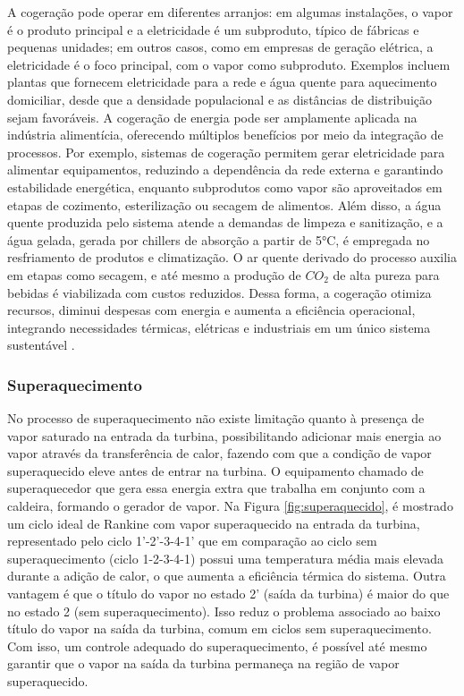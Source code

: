 \documentclass[
	article,			%
	11pt,				%
	oneside,			%
	a4paper,			%
	english,			%
	brazil,				%
	sumario=tradicional
	]{abntex2}
\begin{document}
A cogeração pode operar em diferentes arranjos: em algumas instalações, o vapor é o produto principal e a eletricidade é um subproduto, típico de fábricas e pequenas unidades; em outros casos, como em empresas de geração elétrica, a eletricidade é o foco principal, com o vapor como subproduto. Exemplos incluem plantas que fornecem eletricidade para a rede e água quente para aquecimento domiciliar, desde que a densidade populacional e as distâncias de distribuição sejam favoráveis.
A cogeração de energia pode ser amplamente aplicada na indústria alimentícia, oferecendo múltiplos benefícios por meio da integração de processos. Por exemplo, sistemas de cogeração permitem gerar eletricidade para alimentar equipamentos, reduzindo a dependência da rede externa e garantindo estabilidade energética, enquanto subprodutos como vapor são aproveitados em etapas de cozimento, esterilização ou secagem de alimentos. Além disso, a água quente produzida pelo sistema atende a demandas de limpeza e sanitização, e a água gelada, gerada por chillers de absorção a partir de 5°C, é empregada no resfriamento de produtos e climatização. O ar quente derivado do processo auxilia em etapas como secagem, e até mesmo a produção de $CO_2$ de alta pureza para bebidas é viabilizada com custos reduzidos. Dessa forma, a cogeração otimiza recursos, diminui despesas com energia e aumenta a eficiência operacional, integrando necessidades térmicas, elétricas e industriais em um único sistema sustentável \cite{Ecogen_Cogeracao_2025}.

\subsubsection{Superaquecimento}

No processo de superaquecimento não existe limitação quanto à presença de vapor saturado na entrada da turbina, possibilitando adicionar mais energia ao vapor através da transferência de calor, fazendo com que a condição de vapor superaquecido eleve antes de entrar na turbina. O equipamento chamado de superaquecedor que gera essa energia extra que trabalha em conjunto com a caldeira, formando o gerador de vapor. Na Figura \ref{fig:superaquecido}, é mostrado um ciclo ideal de Rankine com vapor superaquecido na entrada da turbina, representado pelo ciclo 1'-2'-3-4-1' que em comparação ao ciclo sem superaquecimento (ciclo 1-2-3-4-1) possui uma temperatura média mais elevada durante a adição de calor, o que aumenta a eficiência térmica do sistema.
Outra vantagem é que o título do vapor no estado 2' (saída da turbina) é maior do que no estado 2 (sem superaquecimento). Isso reduz o problema associado ao baixo título do vapor na saída da turbina, comum em ciclos sem superaquecimento. Com isso, um controle adequado do superaquecimento, é possível até mesmo garantir que o vapor na saída da turbina permaneça na região de vapor superaquecido.
\end{document}
